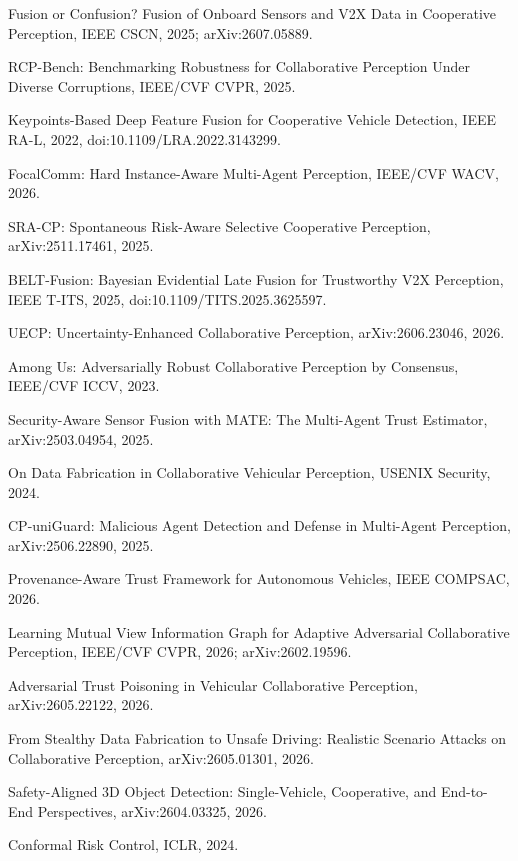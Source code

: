 \documentclass[11pt]{article}
\begin{document}
{\small
\begin{enumerate}[label={[\arabic*]}, leftmargin=2.4em]
  \item Fusion or Confusion? Fusion of Onboard Sensors and V2X Data in
    Cooperative Perception, IEEE CSCN, 2025; arXiv:2607.05889.
  \item RCP-Bench: Benchmarking Robustness for Collaborative Perception Under
    Diverse Corruptions, IEEE/CVF CVPR, 2025.
  \item Keypoints-Based Deep Feature Fusion for Cooperative Vehicle Detection,
    IEEE RA-L, 2022, doi:10.1109/LRA.2022.3143299.
  \item FocalComm: Hard Instance-Aware Multi-Agent Perception, IEEE/CVF WACV,
    2026.
  \item SRA-CP: Spontaneous Risk-Aware Selective Cooperative Perception,
    arXiv:2511.17461, 2025.
  \item BELT-Fusion: Bayesian Evidential Late Fusion for Trustworthy V2X
    Perception, IEEE T-ITS, 2025, doi:10.1109/TITS.2025.3625597.
  \item UECP: Uncertainty-Enhanced Collaborative Perception, arXiv:2606.23046,
    2026.
  \item Among Us: Adversarially Robust Collaborative Perception by Consensus,
    IEEE/CVF ICCV, 2023.
  \item Security-Aware Sensor Fusion with MATE: The Multi-Agent Trust Estimator,
    arXiv:2503.04954, 2025.
  \item On Data Fabrication in Collaborative Vehicular Perception, USENIX
    Security, 2024.
  \item CP-uniGuard: Malicious Agent Detection and Defense in Multi-Agent
    Perception, arXiv:2506.22890, 2025.
  \item Provenance-Aware Trust Framework for Autonomous Vehicles, IEEE COMPSAC,
    2026.
  \item Learning Mutual View Information Graph for Adaptive Adversarial
    Collaborative Perception, IEEE/CVF CVPR, 2026; arXiv:2602.19596.
  \item Adversarial Trust Poisoning in Vehicular Collaborative Perception,
    arXiv:2605.22122, 2026.
  \item From Stealthy Data Fabrication to Unsafe Driving: Realistic Scenario
    Attacks on Collaborative Perception, arXiv:2605.01301, 2026.
  \item Safety-Aligned 3D Object Detection: Single-Vehicle, Cooperative, and
    End-to-End Perspectives, arXiv:2604.03325, 2026.
  \item Conformal Risk Control, ICLR, 2024.
\end{enumerate}
}
\end{document}
